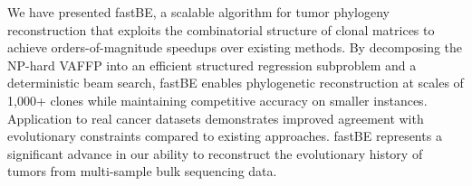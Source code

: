 \documentclass[11pt]{article}
\begin{document}
We have presented fastBE, a scalable algorithm for tumor phylogeny reconstruction that exploits the combinatorial structure of clonal matrices to achieve orders-of-magnitude speedups over existing methods. By decomposing the NP-hard VAFFP into an efficient structured regression subproblem and a deterministic beam search, fastBE enables phylogenetic reconstruction at scales of 1,000+ clones while maintaining competitive accuracy on smaller instances. Application to real cancer datasets demonstrates improved agreement with evolutionary constraints compared to existing approaches. fastBE represents a significant advance in our ability to reconstruct the evolutionary history of tumors from multi-sample bulk sequencing data.



\end{document}
